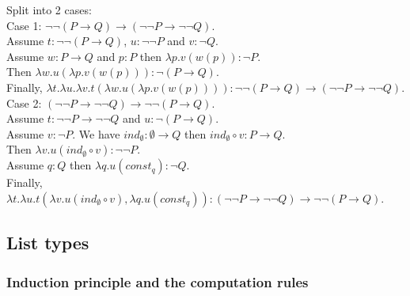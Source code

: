 \documentclass{article}
\begin{document}
\vspace{1em}\par
Split into 2 cases:\\
Case 1: $\lnot\lnot (P \to Q) \to (\lnot\lnot P \to \lnot\lnot Q)$.\\
Assume $t:\lnot\lnot(P \to Q)$, $u:\lnot\lnot P$ and $v:\lnot Q$.\\
Assume $w:P \to Q$ and $p:P$ then $\lambda p.v(w(p)):\lnot P$.\\
Then $\lambda w.u(\lambda p.v(w(p))):\lnot(P \to Q)$.\\
Finally, $\lambda t.\lambda u. \lambda v.t(\lambda w.u(\lambda p.v(w(p)))):\lnot\lnot (P \to Q) \to (\lnot\lnot P \to \lnot\lnot Q)$.\\
Case 2: $(\lnot\lnot P \to \lnot\lnot Q) \to \lnot\lnot (P \to Q)$.\\
Assume $t:\lnot\lnot P \to \lnot\lnot Q$ and $u:\lnot (P \to Q)$.\\
Assume $v:\lnot P$. We have $ind_\emptyset:\emptyset \to Q$ then $ind_\emptyset \circ v:P \to Q$.\\
Then $\lambda v.u(ind_\emptyset \circ v):\lnot\lnot P$.\\
Assume $q:Q$ then $\lambda q.u(const_q):\lnot Q$.\\
Finally, $\lambda t.\lambda u.t(\lambda v.u(ind_\emptyset \circ v),\lambda q.u(const_q)):(\lnot\lnot P \to \lnot\lnot Q) \to \lnot\lnot (P \to Q)$.

\subsection{List types}
\subsubsection{Induction principle and the computation rules}
\begin{prooftree}
\end{prooftree}
\begin{prooftree}
\end{prooftree}
\begin{prooftree}
\end{prooftree}
\end{document}

